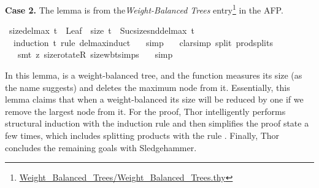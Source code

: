 \documentclass{article}
\begin{document}
{\bf Case 2.} The lemma  is from the\emph{Weight-Balanced Trees} entry\footnote{\url{Weight_Balanced_Trees/Weight_Balanced_Trees.thy}} in the AFP.
\begin{mdframed}
\begin{isabelle}
\isamarkupfalse \ size{\isacharunderscore}{\kern0pt}del{\isacharunderscore}{\kern0pt}max{\isacharcolon}{\kern0pt}\ {\isachardoublequoteopen}t\ {\isasymnoteq}\ Leaf\ {\isasymLongrightarrow}\ size\ t\ {\isacharequal}{\kern0pt}\ Suc{\isacharparenleft}{\kern0pt}size{\isacharparenleft}{\kern0pt}snd{\isacharparenleft}{\kern0pt}del{\isacharunderscore}{\kern0pt}max\ t{\isacharparenright}{\kern0pt}{\isacharparenright}{\kern0pt}{\isacharparenright}{\kern0pt}{\isachardoublequoteclose}\isanewline
\ \ \isamarkupfalse {\isacharparenleft}{\kern0pt}induction\ t\ rule{\isacharcolon}{\kern0pt}\ del{\isacharunderscore}{\kern0pt}max{\isachardot}{\kern0pt}induct{\isacharparenright}{\kern0pt}\isanewline
\ \ \isamarkupfalse \ simp\isanewline
\ \ \isamarkupfalse \ {\isacharparenleft}{\kern0pt}clarsimp\ split{\isacharcolon}{\kern0pt}\ prod{\isachardot}{\kern0pt}splits{\isacharparenright}{\kern0pt}\isanewline
\ \ \isamarkupfalse \ {\isacharparenleft}{\kern0pt}smt\ {\isacharparenleft}{\kern0pt}z{}{\isacharparenright}{\kern0pt}\ size{\isacharunderscore}{\kern0pt}rotateR\ size{\isacharunderscore}{\kern0pt}wbt{\isachardot}{\kern0pt}simps{\isacharparenleft}{\kern0pt}{}{\isacharparenright}{\kern0pt}{\isacharparenright}{\kern0pt}\isanewline
\ \ \isamarkupfalse \ simp\end{isabelle}
\end{mdframed}
In this lemma,  is a weight-balanced tree, and the  function measures its size (as the name suggests) and  deletes the maximum node from it. Essentially, this lemma claims that when a weight-balanced its size will be reduced by one if we remove the largest node from it. For the proof, Thor intelligently performs structural induction with the induction rule  and then simplifies the proof state a few times, which includes splitting products with the rule . Finally, Thor concludes the remaining goals with Sledgehammer.
\end{document}
